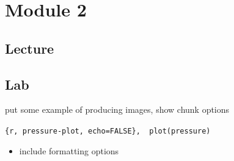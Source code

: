\documentclass[
]{book}
\providecommand{\tightlist}{%
  \setlength{\itemsep}{0pt}\setlength{\parskip}{0pt}}
\begin{document}
\chapter{Module 2}\label{module-2}

\section{Lecture}\label{lecture-1}

\section{Lab}\label{lab-1}

put some example of producing images, show chunk options

\texttt{\{r,\ pressure-plot,\ echo=FALSE\},\ \ plot(pressure)}

\begin{itemize}
\tightlist
\item
  include formatting options
\end{itemize}

  
\end{document}
